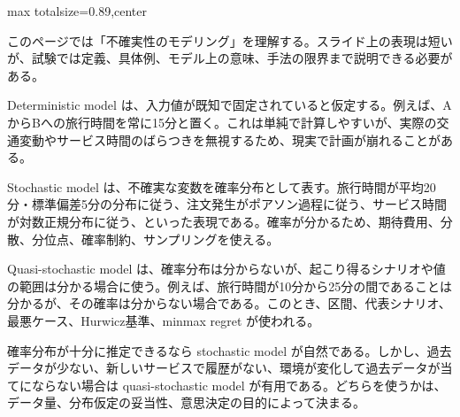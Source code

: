 \begin{minipage}[t]{0.58\textwidth}
\begin{adjustbox}{max totalsize={\textwidth}{0.89\textheight},center}
\begin{minipage}{\textwidth}\scriptsize
{}このページでは「不確実性のモデリング」を理解する。スライド上の表現は短いが、試験では定義、具体例、モデル上の意味、手法の限界まで説明できる必要がある。\par
Deterministic model は、入力値が既知で固定されていると仮定する。例えば、AからBへの旅行時間を常に15分と置く。これは単純で計算しやすいが、実際の交通変動やサービス時間のばらつきを無視するため、現実で計画が崩れることがある。\par
Stochastic model は、不確実な変数を確率分布として表す。旅行時間が平均20分・標準偏差5分の分布に従う、注文発生がポアソン過程に従う、サービス時間が対数正規分布に従う、といった表現である。確率が分かるため、期待費用、分散、分位点、確率制約、サンプリングを使える。\par
Quasi-stochastic model は、確率分布は分からないが、起こり得るシナリオや値の範囲は分かる場合に使う。例えば、旅行時間が10分から25分の間であることは分かるが、その確率は分からない場合である。このとき、区間、代表シナリオ、最悪ケース、Hurwicz基準、minmax regret が使われる。\par
確率分布が十分に推定できるなら stochastic model が自然である。しかし、過去データが少ない、新しいサービスで履歴がない、環境が変化して過去データが当てにならない場合は quasi-stochastic model が有用である。どちらを使うかは、データ量、分布仮定の妥当性、意思決定の目的によって決まる。\par

\end{minipage}
\end{adjustbox}
\end{minipage}
